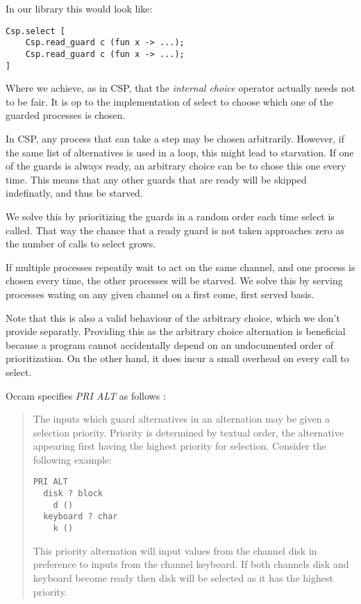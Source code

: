 \documentclass[a4paper,12pt]{article}
\begin{document}
In our library this would look like:
\begin{verbatim}
Csp.select [
    Csp.read_guard c (fun x -> ...);
    Csp.read_guard c (fun x -> ...);
]
\end{verbatim}

Where we achieve, as in CSP, that the {\it internal choice} operator actually
needs not to be fair. It is op to the implementation of select to choose which
one of the guarded processes is chosen.

In CSP, any process that can take a step may be chosen arbitrarily. However, if the same list of 
alternatives is used in a loop, this might lead to starvation. If one of the guards is always ready,
an arbitrary choice can be to chose this one every time. This means that any other guards that are 
ready will be skipped indefinatly, and thus be starved.

We solve this by prioritizing the guards in a random order each time select is called. That way the
chance that a ready guard is not taken approaches zero as the number of calls to select grows.

If multiple processes repeatily wait to act on the same channel, and one process is chosen every time,
the other processes will be starved. We solve this by serving processes wating on any given channel
on a first come, first served basis.

Note that this is also a valid behaviour of the arbitrary choice, which we don't
provide separatly. Providing this as the arbitrary choice alternation is
beneficial because a program cannot accidentally depend on an undocumented
order of prioritization. On the other hand, it does incur a small overhead on
every call to select.

Occam specifies \emph{PRI ALT} as follows \cite{occam}:
\begin{quote}
The inputs which guard alternatives in an alternation may be given 
a selection priority. Priority is determined by textual order, the 
alternative appearing first having the highest priority for 
selection. Consider the following example:
\begin{verbatim}
PRI ALT
  disk ? block
    d ()
  keyboard ? char
    k ()
\end{verbatim}
This priority alternation will input values from the channel disk 
in preference to inputs from the channel keyboard. If both channels 
disk and keyboard become ready then disk will be selected as it has 
the highest priority.
\end{quote}
\end{document}
